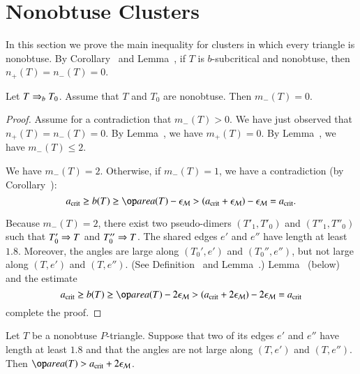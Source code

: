 \section{Nonobtuse Clusters}

In this section we prove the main inequality for clusters in which
every triangle is nonobtuse.  By Corollary~ and
Lemma~, if $T$ is $b$-subcritical and nonobtuse, then
$n_+(T)=n_-(T)=0$.

\begin{lemma} 
  Let $T\Rightarrow_{b} T_0$. Assume that $T$ and $T_0$ are nonobtuse.  Then
  $m_-(T)=0$.
\end{lemma}

\begin{proof}  
  Assume for a contradiction that $m_-(T)>0$.  We have just observed
  that $n_+(T)=n_-(T)=0$.  By Lemma~, we have
  $m_+(T)=0$.  By Lemma~, we have $m_-(T)\le 2$.

  We have $m_-(T)=2$.  Otherwise, if $m_-(T)=1$, we have a
  contradiction (by Corollary~):
\[
\acrit \ge b(T) \ge \area(T) - \epsM 
> (\acrit + \epsM) - \epsM = \acrit.
\]

Because $m_-(T)=2$, there exist two pseudo-dimers $(T'_1,T'_0)$ and
$(T''_1,T''_0)$ such that $T'_0\Rightarrow T$ and $T''_0\Rightarrow T$.  The shared
edges $e'$ and $e''$ have length at least $1.8$.  Moreover, the angles
are large along $(T_0',e')$ and $(T_0'',e'')$, but not large along
$(T,e')$ and $(T,e'')$.  (See Definition~ and
Lemma~.)  Lemma~ (below) and the
estimate
\[
\acrit \ge b(T) \ge \area(T) - 2\epsM 
> (\acrit + 2\epsM) - 2\epsM = \acrit
\]
complete the proof.
\end{proof}

\begin{lemma} 
  Let $T$ be a nonobtuse $P$-triangle.  Suppose that two of its edges
  $e'$ and $e''$ have length at least $1.8$ and that the angles are
  not large along $(T,e')$ and $(T,e'')$.  Then $\area(T) > \acrit +
  2\epsM$.
\end{lemma}

